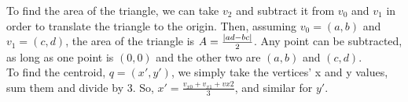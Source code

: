 \documentclass[12pt]{article}
\DeclarePairedDelimiter{\abs}{\lvert}{\rvert}
\begin{document}
\begin{enumerate}
To find the area of the triangle, we can take $v_2$ and subtract it from $v_0$ and $v_1$ in order to translate the triangle to the origin. Then, assuming $v_0 = (a,b)$ and $v_1 = (c,d)$, the area of the triangle is $A = \frac{\abs{ad-bc}}{2}$. Any point can be subtracted, as long as one point is $(0,0)$ and the other two are $(a,b)$ and $(c,d)$.\\
To find the centroid, $q = (x', y')$, we simply take the vertices' x and y values, sum them and divide by 3. So, $x' = \frac{v_{x0} + v_{x1} + v{x2}}{3}$, and similar for $y'$.

\end{enumerate}
\end{document}

